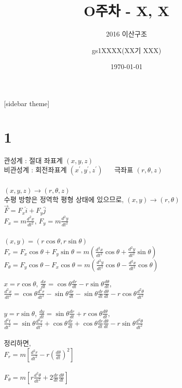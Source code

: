\documentclass[11pt]{beamer}
\title[O주차 - X, X]{O주차 - X, X}
\subtitle[]{2016 이산구조}
\author[]{gs1XXXX(XX기 XXX)}
\institute[GSHS]{경기과학고등학교}
\date[]{\today}
\begin{document}
\begin{frame}[plain]
\titlepage
\end{frame}
[sidebar theme]



\section{1}
\begin{frame}{1.1}\footnotesize
	관성계 : 절대 좌표계 $ (x, y, z)$ \\
	비관성계 : 회전좌표계 $ (x^{\prime}, y^{\prime}, z^{\prime})$ ~~ 극좌표 $ (r, \theta, z)$\\
	\\
	$ (x, y, z) 	\rightarrow (r, \theta, z)$\\
	수평 방향은 정역학 평형 상태에 있으므로, 	$ (x, y) 	\rightarrow (r, \theta)$\\
	$ \overrightarrow {F} = F_{x} \hat{i}  + F_{y} \hat{j} $\\
	$ F_{x} = m \frac{d^{2}x}{dt^{2}}$, $ F_{y} = m \frac{d^{2}y}{dt^{2}}$\\
	\\
	$ (x, y) = (r \cos \theta, r \sin \theta)$\\
	$ F_{r} = F_{x} \cos \theta + F_{y} \sin \theta = m \left ( \frac{d^{2}x}{dt^{2}} \cos \theta + \frac{d^{2}y}{dt^{2}} \sin \theta \right) $\\
	$ F_{\theta} = F_{y} \cos \theta - F_{x} \cos \theta = m \left ( \frac{d^{2}y}{dt^{2}} \cos \theta - \frac{d^{2}x}{dt^{2}} \cos \theta \right) $\\
\end{frame}

\begin{frame}{1.2}\footnotesize
	$ x = r \cos \theta $, $\frac{dx}{dt} = \cos \theta \frac{dr}{dt} - r \sin \theta \frac{d\theta}{dt}$, \\
	$\frac{d^{2}x}{dt^{2}} = \cos \theta \frac{d^{2}r}{dt^{2}} - \sin \theta \frac{dr}{dt} - \sin \theta \frac{dr}{dt} \frac{d\theta}{dt} -r \cos \theta \frac{d^{2}\theta}{dt^{2}}$\\
	\\
	$ y = r \sin \theta $, $\frac{dy}{dt} = \sin \theta \frac{dr}{dt} + r \cos \theta \frac{d\theta}{dt}$, \\
	$\frac{d^{2}t}{dt^{2}} = \sin \theta \frac{d^{2}r}{dt^{2}} + \cos \theta \frac{dr}{dt} + \cos \theta \frac{dr}{dt} \frac{d\theta}{dt} -r \sin \theta \frac{d^{2}\theta}{dt^{2}}$\\
	\\

	정리하면, \\
	
	$ F_{r} = m \left[ \frac{d^{2}r}{dt^{2}} - r \left( {\frac{d \theta}{dt}} \right)^{2} \right] $\\
	\\
	$ F_{\theta} = m \left[ r \frac{d^{2}\theta}{dt^{2}} + 2 \frac{dr}{dt} \frac{d\theta}{dt}  \right] $\\

\end{frame}
\end{document}
